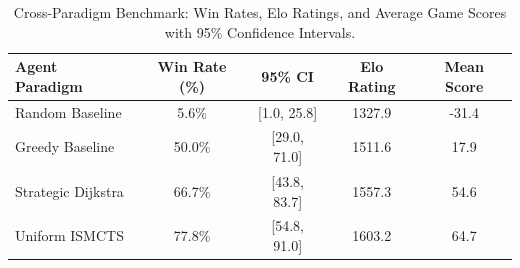 \begin{table}[htbp]
\centering
\caption{Cross-Paradigm Benchmark: Win Rates, Elo Ratings, and Average Game Scores with 95\% Confidence Intervals.}
\label{tab:main_results}
\begin{tabular}{lcccc}
\hline
\textbf{Agent Paradigm} & \textbf{Win Rate (\%)} & \textbf{95\% CI} & \textbf{Elo Rating} & \textbf{Mean Score} \\
\hline
Random Baseline & 5.6\% & [1.0, 25.8] & 1327.9 & -31.4 \\
Greedy Baseline & 50.0\% & [29.0, 71.0] & 1511.6 & 17.9 \\
Strategic Dijkstra & 66.7\% & [43.8, 83.7] & 1557.3 & 54.6 \\
Uniform ISMCTS & 77.8\% & [54.8, 91.0] & 1603.2 & 64.7 \\
\hline
\end{tabular}
\end{table}